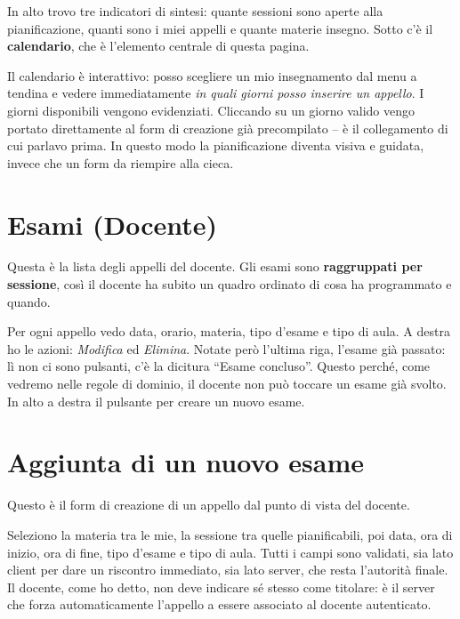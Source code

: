 \documentclass[11pt]{article}
\begin{document}
In alto trovo tre indicatori di sintesi: quante sessioni sono aperte alla pianificazione,
quanti sono i miei appelli e quante materie insegno. Sotto c'è il \textbf{calendario},
che è l'elemento centrale di questa pagina.

Il calendario è interattivo: posso scegliere un mio insegnamento dal menu a tendina e
vedere immediatamente \emph{in quali giorni posso inserire un appello}. I giorni
disponibili vengono evidenziati. Cliccando su un giorno valido vengo portato
direttamente al form di creazione già precompilato -- è il collegamento di cui parlavo
prima. In questo modo la pianificazione diventa visiva e guidata, invece che un form da
riempire alla cieca.

\section*{Esami (Docente)}

Questa è la lista degli appelli del docente. Gli esami sono \textbf{raggruppati per
sessione}, così il docente ha subito un quadro ordinato di cosa ha programmato e quando.

Per ogni appello vedo data, orario, materia, tipo d'esame e tipo di aula. A destra ho le
azioni: \emph{Modifica} ed \emph{Elimina}. Notate però l'ultima riga, l'esame già
passato: lì non ci sono pulsanti, c'è la dicitura ``Esame concluso''. Questo perché,
come vedremo nelle regole di dominio, il docente non può toccare un esame già svolto.
In alto a destra il pulsante per creare un nuovo esame.

\section*{Aggiunta di un nuovo esame}

Questo è il form di creazione di un appello dal punto di vista del docente.

Seleziono la materia tra le mie, la sessione tra quelle pianificabili, poi data, ora di
inizio, ora di fine, tipo d'esame e tipo di aula. Tutti i campi sono validati, sia lato
client per dare un riscontro immediato, sia lato server, che resta l'autorità finale.
Il docente, come ho detto, non deve indicare sé stesso come titolare: è il server che
forza automaticamente l'appello a essere associato al docente autenticato.

\end{document}
